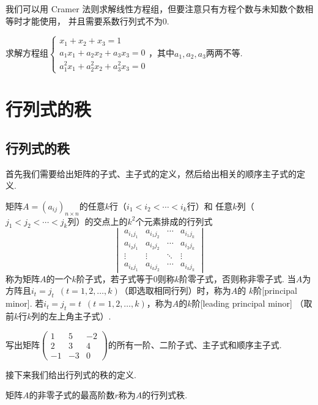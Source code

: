 我们可以用 Cramer 法则求解线性方程组，但要注意只有方程个数与未知数个数相等时才能使用，
并且需要系数行列式不为0.
\begin{example}
    求解方程组$\begin{cases}
        x_1+x_2+x_3=1 \\
        a_1x_1+a_2x_2+a_3x_3=0 \\
        a_1^2x_1+a_2^2x_2+a_3^2x_3=0
    \end{cases}$，其中$a_1,a_2,a_3$两两不等.
\end{example}

\section{行列式的秩}
\subsection{行列式的秩}
首先我们需要给出矩阵的子式、主子式的定义，然后给出相关的顺序主子式的定义.
\begin{definition}
    矩阵$A=(a_{ij})_{n \times n}$的任意$k$行（$i_1<i_2<\cdots<i_k$行）和
    任意$k$列（$j_1<j_2<\cdots<j_k$列）的交点上的$k^2$个元素排成的行列式
    \[\begin{vmatrix}
        a_{i_1j_1} & a_{i_1j_2} & \cdots & a_{i_1j_k} \\
        a_{i_2j_1} & a_{i_2j_2} & \cdots & a_{i_2j_k} \\
        \vdots & \vdots & \ddots  & \vdots \\
        a_{i_kj_1} & a_{i_kj_2} & \cdots & a_{i_kj_k}
    \end{vmatrix}\]
    称为矩阵$A$的一个$k$阶子式，若子式等于0则称$k$阶零子式，否则称非零子式.
    当$A$为方阵且$i_t=j_t\enspace(t=1,2,\ldots,k)$（即选取相同行列）时，称为$A$的
    $k$阶[principal minor]. 若$i_t=j_t=t\enspace(t=1,2,\ldots,k)$，称为$A$的$k$阶[leading principal minor]
    （取前$k$行$k$列的左上角主子式）.
\end{definition}
\begin{example}
    写出矩阵$\begin{pmatrix}
        1 & 5 & -2 \\ 2 & 3 & 4 \\ -1 & -3 & 0
    \end{pmatrix}$的所有一阶、二阶子式、主子式和顺序主子式.
\end{example}
接下来我们给出行列式的秩的定义.
\begin{definition}
    矩阵$A$的非零子式的最高阶数$r$称为$A$的行列式秩.
\end{definition}
